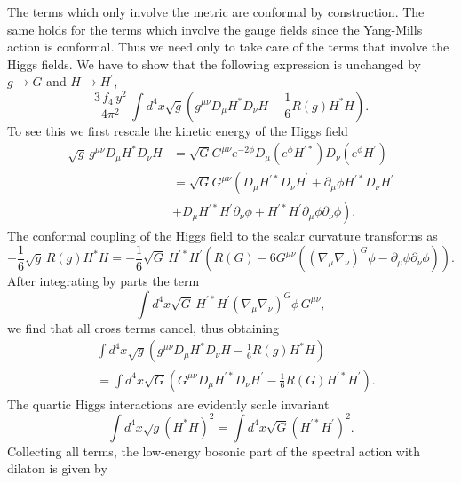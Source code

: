 \documentclass[12pt]{article}%
\begin{document}
The terms which only involve the metric are conformal by construction. The
same holds for the terms which involve the gauge fields since the Yang-Mills
action is conformal. Thus we need only to take care of the terms that involve
the Higgs fields. We have to show that the following expression is unchanged
by $g\rightarrow G$ and $H\rightarrow H^{\prime}$,
\[
\frac{3\,f_{4}\,y^{2}}{4\pi^{2}}\,\int d^{4}x\sqrt{g}\left(  g^{\mu\nu}D_{\mu
}H^{\ast}D_{\nu}H-\frac{1}{6}R\left(  g\right)  H^{\ast}H\right)  .
\]
To see this we first rescale the kinetic energy of the Higgs field
\begin{align*}
\sqrt{g}\,g^{\mu\nu}D_{\mu}H^{\ast}D_{\nu}H  &  =\sqrt{G}G^{\mu\nu}e^{-2\phi
}D_{\mu}\left(  e^{\phi}H^{\prime\ast}\right)  D_{\nu}\left(  e^{\phi
}H^{\prime}\right) \\
&  =\sqrt{G}G^{\mu\nu}\left(  D_{\mu}H^{\prime\ast}D_{\nu}H^{^{\prime}%
}+\partial_{\mu}\phi H^{\prime\ast}D_{\nu}H^{\prime}\right. \\
&  \left.  +D_{\mu}H^{\prime\ast}H^{\prime}\partial_{\nu}\phi+H^{\prime\ast
}H^{\prime}\partial_{\mu}\phi\partial_{\nu}\phi\right)  .
\end{align*}
The conformal coupling of the Higgs field to the scalar curvature transforms
as%
\[
-\frac{1}{6}\sqrt{g}\,R(g)H^{\ast}H=-\frac{1}{6}\sqrt{G}\,H^{\prime\ast
}H^{\prime}\left(  R(G)-6G^{\mu\nu}\left(  \left(  \nabla_{\mu}\nabla_{\nu
}\right)  ^{G}\phi-\partial_{\mu}\phi\partial_{\nu}\phi\right)  \right)  .
\]
After integrating by parts the term
\[
\int d^{4}x\sqrt{G}\,H^{\prime\ast}H^{\prime}\left(  \nabla_{\mu}\nabla_{\nu
}\right)  ^{G}\phi\,G^{\mu\nu},
\]
we find that all cross terms cancel, thus obtaining
\begin{align*}
&  \int d^{4}x\sqrt{g}\left(  g^{\mu\nu}D_{\mu}H^{\ast}D_{\nu}H-\frac{1}%
{6}R\left(  g\right)  H^{\ast}H\right) \\
&  =\int d^{4}x\sqrt{G}\left(  G^{\mu\nu}D_{\mu}H^{\prime\ast}D_{\nu}%
H^{\prime}-\frac{1}{6}R\left(  G\right)  H^{\prime\ast}H^{\prime}\right)  .
\end{align*}
The quartic Higgs interactions are evidently scale invariant
\[
\int d^{4}x\sqrt{g}\left(  H^{\ast}H\right)  ^{2}=\int d^{4}x\sqrt{G}\left(
H^{\prime\ast}H^{\prime}\right)  ^{2}.
\]
Collecting all terms, the low-energy bosonic part of the spectral action with
dilaton is given by%
\end{document}
